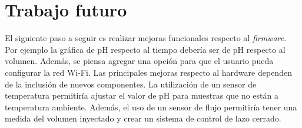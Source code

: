 \section{Trabajo futuro}

El siguiente paso a seguir es realizar mejoras funcionales respecto al \textit{firmware}. Por ejemplo la gráfica de pH respecto al tiempo debería ser de pH respecto al volumen. Además, se piensa agregar una opción para que el usuario pueda configurar la red Wi-Fi. Las principales mejoras respecto al hardware dependen de la inclusión de nuevos componentes. La utilización de un sensor de temperatura permitiría ajustar el valor de pH para muestras que no están a temperatura ambiente. Además, el uso de un sensor de flujo permitiría tener una medida del volumen inyectado y crear un sistema de control de lazo cerrado.